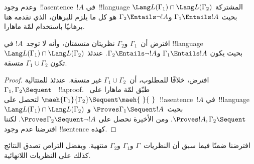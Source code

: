 \documentclass[../../../include/open-logic-section]{subfiles}
\begin{document}
وعدم وجود~!!a{sentence}~$!A$ في~!!{language} المشتركة
$\Lang L(\Gamma_1) \cap \Lang L(\Gamma_2)$ بحيث
$\Gamma_1 \Entails !A$ و$\Gamma_2 \Entails \lnot !A$ هو كل ما يلزم
للبرهان، الذي نقدمه هنا برهانيًا باستخدام لمّة ماهارا.

\begin{thm}
افترض أن~$\Gamma_1$ و$\Gamma_2$ نظريتان متسقتان، وأنه لا توجد~$!A$ في
!!{language}~$\Lang L(\Gamma_1) \cap \Lang L(\Gamma_2)$ بحيث يكون
$\Gamma_1 \Entails !A$ و$\Gamma_2 \Entails \lnot !A$. عندئذ تكون
$\Gamma_1 \cup \Gamma_2$ متسقة.
\end{thm}

\begin{proof}
  افترض، خلافًا للمطلوب، أن~$\Gamma_1 \cup \Gamma_2$ غير متسقة. عندئذ
  للمتتالية~$\Gamma_1, \Gamma_2 \Sequent \ $~!!a{proof}. طبّق لمّة
  ماهارا على~$\maeh{\Gamma_1}{\Gamma_2} \Sequent \maeh{\ }{\ }$
  لتحصل على~!!a{sentence}~$!A$ في~!!{language}~$\Lang L(\Gamma_1)
  \cap \Lang L(\Gamma_2)$ بحيث~$\Proves \Gamma_1 \Sequent !A$ و
  $\Proves !A, \Gamma_2 \Sequent \quad$. ومن الأخيرة نحصل على
  $\Proves \Gamma_2 \Sequent \lnot !A$. لكننا افترضنا عدم وجود
  !!{sentence} كهذه.
\end{proof}

افترضنا ضمنًا فيما سبق أن النظريات~$\Gamma$ و$\Gamma_1$ و$\Gamma_2$
منتهية. وبفضل التراص تصدق النتائج كذلك على النظريات اللانهائية.
\end{document}

